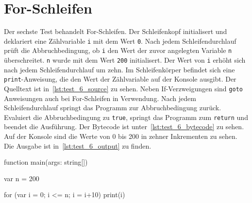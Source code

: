 \section{For-Schleifen}

Der sechste Test behandelt For-Schleifen. Der Schleifenkopf initialisert und deklariert eine Zählvariable \texttt{i} mit dem Wert \texttt{0}. Nach jedem Schleifendurchlauf prüft die Abbruchbedingung, ob \texttt{i} den Wert der zuvor angelegten Variable \texttt{n} überschreitet. \texttt{n} wurde mit dem Wert \texttt{200} initialisert. Der Wert von \texttt{i} erhöht sich nach jedem Schleifendurchlauf um zehn. Im Schleifenkörper befindet sich eine \texttt{print}-Anweisung, die den Wert der Zählvariable auf der Konsole ausgibt. Der Quelltext ist in~\autoref{lst:test_6_source} zu sehen. Neben If-Verzweigungen sind \texttt{goto} Anweisungen auch bei For-Schleifen in Verwendung. Nach jedem Schleifendurchlauf springt das Programm zur Abbruchbedingung zurück. Evaluiert die Abbruchbedingung zu \texttt{true}, springt das Programm zum \texttt{return} und beendet die Ausführung. Der Bytecode ist unter~\autoref{lst:test_6_bytecode} zu sehen. Auf der Konsole sind die Werte von 0 bis 200 in zehner Inkrementen zu sehen. Die Ausgabe ist in~\autoref{lst:test_6_output} zu finden.

\begin{ToyaCode}[numbers=none, caption={For-Schleifen},label=lst:test_6_source]
function main(args: string[]) {
    var n = 200

    for (var i = 0; i <= n; i = i+10) {
        print(i)
    }
}
\end{ToyaCode}


